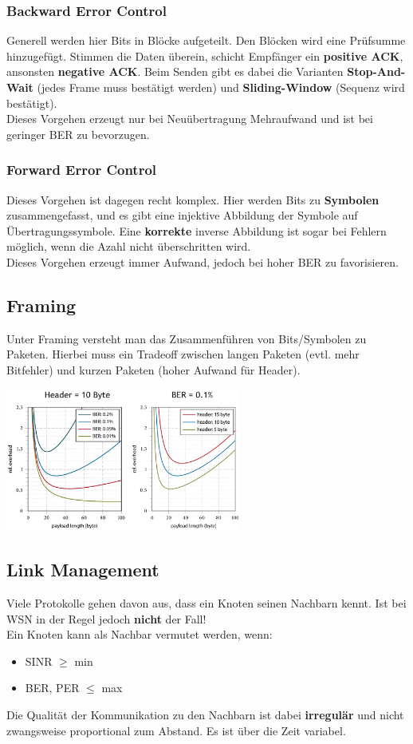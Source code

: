 \documentclass[a4paper]{article}
\begin{document}
\subsubsection{Backward Error Control}
Generell werden hier Bits in Blöcke aufgeteilt. Den Blöcken wird eine Prüfsumme hinzugefügt. Stimmen die Daten überein, schicht Empfänger ein \textbf{positive ACK}, ansonsten \textbf{negative ACK}. Beim Senden gibt es dabei die Varianten \textbf{Stop-And-Wait} (jedes Frame muss bestätigt werden) und \textbf{Sliding-Window} (Sequenz wird bestätigt). \\

Dieses Vorgehen erzeugt nur bei Neuübertragung Mehraufwand und ist bei geringer BER zu bevorzugen.
\subsubsection{Forward Error Control}
Dieses Vorgehen ist dagegen recht komplex. Hier werden Bits zu \textbf{Symbolen} zusammengefasst, und es gibt eine injektive Abbildung der Symbole auf Übertragungssymbole. Eine \textbf{korrekte} inverse Abbildung ist sogar bei Fehlern möglich, wenn die Azahl nicht überschritten wird.\\

Dieses Vorgehen erzeugt immer Aufwand, jedoch bei hoher BER zu favorisieren.

\subsection{Framing}
Unter Framing versteht man das Zusammenführen von Bits/Symbolen zu Paketen. Hierbei muss ein Tradeoff zwischen langen Paketen (evtl. mehr Bitfehler) und kurzen Paketen (hoher Aufwand für Header).
\begin{center}
	\includegraphics[height = 4.7cm]{Packetsize.png}
\end{center}
\subsection{Link Management}
Viele Protokolle gehen davon aus, dass ein Knoten seinen Nachbarn kennt. Ist bei WSN in der Regel jedoch \textbf{nicht} der Fall!\\
Ein Knoten kann als Nachbar vermutet werden, wenn:
\begin{itemize}
	\item SINR $\geq$ min
	\item BER, PER $\leq$ max
\end{itemize}
Die Qualität der Kommunikation zu den Nachbarn ist dabei \textbf{irregulär} und nicht zwangsweise proportional zum Abstand. Es ist über die Zeit variabel.\\
\end{document}
